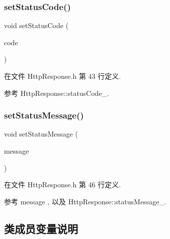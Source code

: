 \subsubsection{\texorpdfstring{set\+Status\+Code()}{setStatusCode()}}
{\footnotesize\ttfamily void set\+Status\+Code (\begin{DoxyParamCaption}\item[{\hyperlink{classmuduo_1_1net_1_1HttpResponse_ab80f66127508dfced7a0fe1929fe12cc}{Http\+Status\+Code}}]{code }\end{DoxyParamCaption})\hspace{0.3cm}{\ttfamily [inline]}}



在文件 Http\+Response.\+h 第 43 行定义.



参考 Http\+Response\+::status\+Code\+\_\+.

\mbox{\label{classmuduo_1_1net_1_1HttpResponse_abb542ea3323fddfbcc172c75fe4e6015}} 
\subsubsection{\texorpdfstring{set\+Status\+Message()}{setStatusMessage()}}
{\footnotesize\ttfamily void set\+Status\+Message (\begin{DoxyParamCaption}\item[{const string \&}]{message }\end{DoxyParamCaption})\hspace{0.3cm}{\ttfamily [inline]}}



在文件 Http\+Response.\+h 第 46 行定义.



参考 message , 以及 Http\+Response\+::status\+Message\+\_\+.



\subsection{类成员变量说明}
\mbox{\label{classmuduo_1_1net_1_1HttpResponse_a72879b508873c81ba40a4919bc67ab7f}} 
